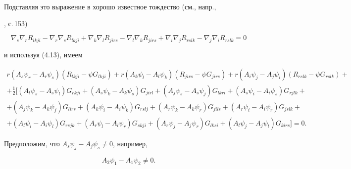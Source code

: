 Подставляя это выражение в хорошо известное тождество (см., напр.,


\cite{11}, с.\,153)


\begin{equation}


\nabla_s \nabla_r R_{lkji}-\nabla_r \nabla_s R_{lkji}


+\nabla_k\nabla_l R_{jirs}-\nabla_l\nabla_k R_{jirs}+


\nabla_i\nabla_j R_{rslk}-\nabla_j\nabla_i R_{rslk}=0\tag{4.15}


\end{equation}


и используя (4.13), имеем


\begin{multline}


r(A_s\psi_r-A_r\psi_s)(R_{lkji}-\psi G_{lkji})+


r(A_k\psi_l-A_l\psi_k)(R_{jirs}-\psi G_{jirs})+


r(A_i\psi_j-A_j\psi_i)(R_{rslk}-\psi G_{rslk})+ \\


+\tfrac{1}{2}[


(A_l\psi_s-A_s\psi_l)G_{rkji}+(A_s\psi_k-A_k\psi_s)


G_{jirl}+


(A_j\psi_s-A_s\psi_j)G_{lkri}+(A_s\psi_i-A_i\psi_s)


G_{rjlk}+\\


+(A_j\psi_k-A_k\psi_j)G_{lirs}+(A_k\psi_i-A_i\psi_k)


G_{rslj}+


(A_r\psi_k-A_k\psi_r)G_{jils}+(A_r\psi_i-A_i\psi_r)


G_{jslk}+\\


+(A_l\psi_i-A_i\psi_l)G_{rsjk}+(A_r\psi_l-A_l\psi_r)


G_{skji}+


(A_r\psi_j-A_j\psi_r)G_{lksi}+(A_l\psi_j-A_j\psi_l)


G_{kirs}]=0.\tag{4.16}


\end{multline}


Предположим, что $A_s\psi_j-A_j\psi_s\ne 0$, например,


\begin{equation}


A_2\psi_1-A_1\psi_2\ne 0.\tag{4.17}


\end{equation}


